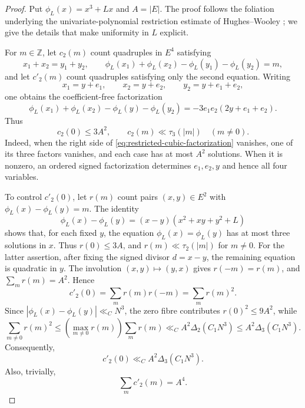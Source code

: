 \documentclass[11pt,reqno]{amsart}
\theoremstyle{definition}
\theoremstyle{remark}
\begin{document}
\begin{proof}
Put $\phi_L(x)=x^3+Lx$ and $A=|E|$.  The proof follows the foliation
underlying the univariate-polynomial restriction estimate of
Hughes--Wooley \cite[Theorem~4.1]{HughesWooley2022}; we give the details
that make uniformity in $L$ explicit.

For $m\in\mathbb Z$, let $c_2(m)$ count quadruples in $E^4$ satisfying
\begin{equation}\label{eq:restricted-two-pair}
 x_1+x_2=y_1+y_2,\qquad
 \phi_L(x_1)+\phi_L(x_2)-\phi_L(y_1)-\phi_L(y_2)=m,
\end{equation}
and let $c'_2(m)$ count quadruples satisfying only the second equation.
Writing
\[
 x_1=y+e_1,\qquad x_2=y+e_2,
 \qquad y_2=y+e_1+e_2,
\]
one obtains the coefficient-free factorization
\begin{equation}\label{eq:restricted-cubic-factorization}
 \phi_L(x_1)+\phi_L(x_2)-\phi_L(y)-\phi_L(y_2)
 =-3e_1e_2(2y+e_1+e_2).
\end{equation}
Thus
\begin{equation}\label{eq:c2-bounds}
 c_2(0)\leq3A^2,\qquad
 c_2(m)\ll\tau_3(|m|)\quad(m\ne0).
\end{equation}
Indeed, when the right side of
\eqref{eq:restricted-cubic-factorization} vanishes, one of its three
factors vanishes, and each case has at most $A^2$ solutions.  When it is
nonzero, an ordered signed factorization determines $e_1,e_2,y$ and hence
all four variables.

To control $c'_2(0)$, let $r(m)$ count pairs $(x,y)\in E^2$ with
$\phi_L(x)-\phi_L(y)=m$.  The identity
\begin{equation}\label{eq:first-cubic-factorization}
 \phi_L(x)-\phi_L(y)
 =(x-y)(x^2+xy+y^2+L)
\end{equation}
shows that, for each fixed $y$, the equation
$\phi_L(x)=\phi_L(y)$ has at most three solutions in $x$.  Thus
$r(0)\leq3A$, and
$r(m)\ll\tau_2(|m|)$ for $m\ne0$.  For the latter assertion, after fixing
the signed divisor $d=x-y$, the remaining equation is quadratic in $y$.
The involution $(x,y)\mapsto(y,x)$ gives $r(-m)=r(m)$, and
$\sum_m r(m)=A^2$.  Hence
\[
 c'_2(0)=\sum_m r(m)r(-m)=\sum_m r(m)^2.
\]
Since $|\phi_L(x)-\phi_L(y)|\ll_C N^3$, the zero fibre contributes
$r(0)^2\leq9A^2$, while
\[
 \sum_{m\ne0}r(m)^2
 \leq\left(\max_{m\ne0}r(m)\right)\sum_mr(m)
 \ll_C A^2\Delta_2(C_1N^3)
 \leq A^2\Delta_3(C_1N^3).
\]
Consequently,
\begin{equation}\label{eq:c2prime-zero}
 c'_2(0)\ll_C A^2\Delta_3(C_1N^3).
\end{equation}
Also, trivially,
\begin{equation}\label{eq:c2prime-mass}
 \sum_m c'_2(m)=A^4.
\end{equation}


\end{proof}
\end{document}
